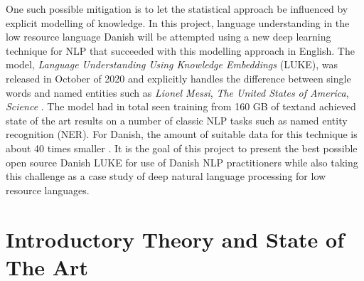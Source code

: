 \documentclass[main.tex]{subfiles}
\begin{document}
One such possible mitigation is to let the statistical approach be influenced by explicit modelling of knowledge.
In this project, language understanding in the low resource language Danish will be attempted using a new deep learning technique for NLP that succeeded with this modelling approach in English.
The model, \emph{Language Understanding Using Knowledge Embeddings} (LUKE), was released in October of 2020 and explicitly handles the difference between single words and named entities such as \emph{Lionel Messi}, \emph{The United States of America}, \emph{Science} \cite{yamada2020luke}.
The model had in total seen training from 160 GB of text\footnotemark and achieved state of the art results on a number of classic NLP tasks such as named entity recognition (NER).
For Danish, the amount of suitable data for this technique is about 40 times smaller \footnotemark.
It is the goal of this project to present the best possible open source Danish LUKE for use of Danish NLP practitioners while also taking this challenge as a case study of deep natural language processing for low resource languages.

\section{Introductory Theory and State of The Art}
\label{sota}
\end{document}

